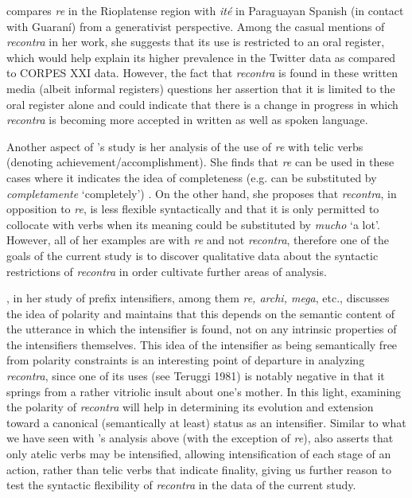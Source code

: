 \documentclass[output=paper,colorlinks,citecolor=brown,
]{langscibook}
\begin{document}
\citet{kornfeld2012cuantificacion} compares \textit{re} in the Rioplatense region with \textit{ité} in Paraguayan Spanish (in contact with Guaraní) from a generativist perspective. Among the casual mentions of \textit{recontra} in her work, she suggests that its use is restricted to an oral register, which would help explain its higher prevalence in the Twitter data as compared to CORPES XXI data. However, the fact that \textit{recontra} is found in these written media (albeit informal registers) questions her assertion that it is limited to the oral register alone and could indicate that there is a change in progress in which \textit{recontra} is becoming more accepted in written as well as spoken language.  

Another aspect of \citeauthor{kornfeld2012cuantificacion}'s study is her analysis of the use of \textit{re} with telic verbs (denoting achievement/accomplishment). She finds that \textit{re} can be used in these cases where it indicates the idea of completeness (e.g. can be substituted by \textit{completamente} `completely') \citep[73--75]{kornfeld2012cuantificacion}. On the other hand, she proposes that \textit{recontra}, in opposition to \textit{re}, is less flexible syntactically and that it is only permitted to collocate with verbs when its meaning could be substituted by \textit{mucho} `a lot’. However, all of her examples are with \textit{re} and not \textit{recontra}, therefore one of the goals of the current study is to discover qualitative data about the syntactic restrictions of \textit{recontra} in order cultivate further areas of analysis.

\citet[103]{martin1998prefijos}, in her study of prefix intensifiers, among them \textit{re, archi, mega}, etc., discusses the idea of polarity and maintains that this depends on the semantic content of the utterance in which the intensifier is found, not on any intrinsic properties of the intensifiers themselves. This idea of the intensifier as being semantically free from polarity constraints is an interesting point of departure in analyzing \textit{recontra}, since one of its uses (see Teruggi 1981) is notably negative in that it springs from a rather vitriolic insult about one’s mother. In this light, examining the polarity of \textit{recontra} will help in determining its evolution and extension toward a canonical (semantically at least) status as an intensifier. Similar to what we have seen with \citeauthor{kornfeld2012cuantificacion}’s analysis above (with the exception of \textit{re}), \citeauthor{martin1998prefijos} also asserts that only atelic verbs may be intensified, allowing intensification of each stage of an action, rather than telic verbs that indicate finality, giving us further reason to test the syntactic flexibility of \textit{recontra} in the data of the current study. 
\end{document}
